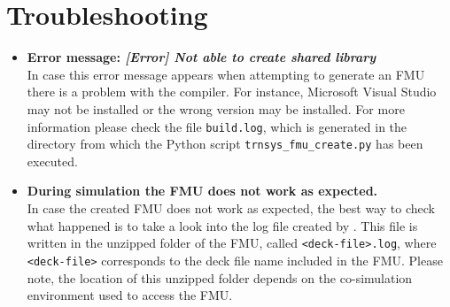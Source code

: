 \chapter{Troubleshooting}

\begin{itemize}

  \item \textbf{Error message: \textit{[Error] Not able to create shared library}}\\
  In case this error message appears when attempting to generate an FMU there is a problem with the compiler.
  For instance, Microsoft Visual Studio may not be installed or the wrong version may be installed.
  For more information please check the file \texttt{build.log}, which is generated in the directory from which the Python script \texttt{trnsys\_fmu\_create.py} has been executed.
  
  \item \textbf{During simulation the FMU does not work as expected.}\\
  In case the created FMU does not work as expected, the best way to check what happened is to take a look into the log file created by \trnsys.
  This file is written in the unzipped folder of the FMU, called \texttt{<deck-file>.log}, where \texttt{<deck-file>} corresponds to the deck file name included in the FMU.
  Please note, the location of this unzipped folder depends on the co-simulation environment used to access the FMU.

\end{itemize}




